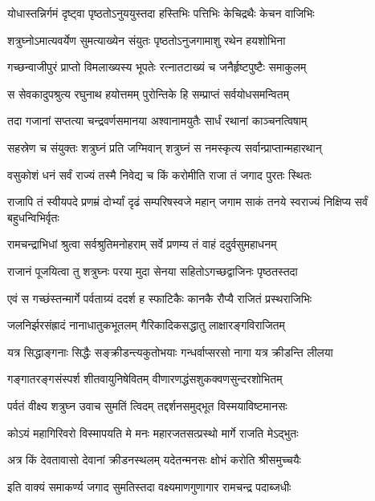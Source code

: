 \twolineshloka
{योधास्तन्निर्गमं दृष्ट्वा पृष्ठतोऽनुययुस्तदा}
{हस्तिभिः पत्तिभिः केचिद्रथैः केचन वाजिभिः}%

\twolineshloka
{शत्रुघ्नोऽमात्यवर्येण सुमत्याख्येन संयुतः}
{पृष्ठतोऽनुजगामाशु रथेन हयशोभिना}%

\twolineshloka
{गच्छन्वाजीपुरं प्राप्तो विमलाख्यस्य भूपतेः}
{रत्नातटाख्यं च जनैर्हृष्टपुष्टैः समाकुलम्}%

\twolineshloka
{स सेवकादुपश्रुत्य रघुनाथ हयोत्तमम्}
{पुरोन्तिके हि सम्प्राप्तं सर्वयोधसमन्वितम्}%

\twolineshloka
{तदा गजानां सप्तत्या चन्द्रवर्णसमानया}
{अश्वानामयुतैः सार्धं रथानां काञ्चनत्विषाम्}%

\twolineshloka
{सहस्रेण च संयुक्तः शत्रुघ्नं प्रति जग्मिवान्}
{शत्रुघ्नं स नमस्कृत्य सर्वान्प्राप्तान्महारथान्}%

\twolineshloka
{वसुकोशं धनं सर्वं राज्यं तस्मै निवेद्य च}
{किं करोमीति राजा तं जगाद पुरतः स्थितः}%

\fourlineindentedshloka
{राजापि तं स्वीयपदे प्रणम्रं}
{दोर्भ्यां दृढं सम्परिषस्वजे महान्}
{जगाम साकं तनये स्वराज्यं}
{निक्षिप्य सर्वं बहुधन्विभिर्वृतः}%

\twolineshloka
{रामचन्द्राभिधां श्रुत्वा सर्वश्रुतिमनोहराम्}
{सर्वे प्रणम्य तं वाहं ददुर्वसुमहाधनम्}%

\twolineshloka
{राजानं पूजयित्वा तु शत्रुघ्नः परया मुदा}
{सेनया सहितोऽगच्छद्वाजिनः पृष्ठतस्तदा}%

\twolineshloka
{एवं स गच्छंस्तन्मार्गे पर्वताग्र्यं ददर्श ह}
{स्फाटिकैः कानकै रौप्यै राजितं प्रस्थराजिभिः}%

\twolineshloka
{जलनिर्झरसंह्रादं नानाधातुकभूतलम्}
{गैरिकादिकसद्धातु लाक्षारङ्गविराजितम्}%

\twolineshloka
{यत्र सिद्धाङ्गनाः सिद्धैः सङ्क्रीडन्त्यकुतोभयाः}
{गन्धर्वाप्सरसो नागा यत्र क्रीडन्ति लीलया}%

\twolineshloka
{गङ्गातरङ्गसंस्पर्श शीतवायुनिषेवितम्}
{वीणारणद्धंसशुकक्वणसुन्दरशोभितम्}%

\twolineshloka
{पर्वतं वीक्ष्य शत्रुघ्न उवाच सुमतिं त्विदम्}
{तद्दर्शनसमुद्भूत विस्मयाविष्टमानसः}%

\twolineshloka
{कोऽयं महागिरिवरो विस्मापयति मे मनः}
{महारजतसत्प्रस्थो मार्गे राजति मेऽद्भुतः}%

\twolineshloka
{अत्र किं देवतावासो देवानां क्रीडनस्थलम्}
{यदेतन्मनसः क्षोभं करोति श्रीसमुच्चयैः}%

\twolineshloka
{इति वाक्यं समाकर्ण्य जगाद सुमतिस्तदा}
{वक्ष्यमाणगुणागार रामचन्द्र पदाब्जधीः}%


